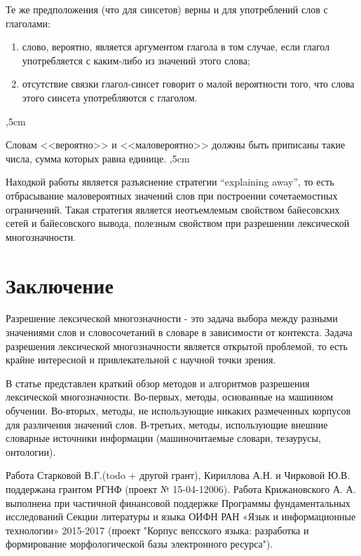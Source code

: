 \documentclass{article}
\begin{document}
\begin{articletext}
Те же предположения (что для синсетов) верны и для употреблений слов с глаголами:
\begin{enumerate}
\item слово, вероятно, является аргументом глагола в том случае, если глагол употребляется с каким-либо из значений этого слова;
\item отсутствие связки глагол-синсет говорит о малой вероятности того, что слова этого синсета употребляются с глаголом.
\end{enumerate}
,5cm

Словам <<вероятно>> и <<маловероятно>> должны быть приписаны такие числа, сумма которых равна единице. 
,5cm

Находкой работы \cite{Ciaramita 2000} является разъяснение стратегии “explaining away”, то есть отбрасывание маловероятных значений слов при построении сочетаемостных ограничений. Такая стратегия является неотъемлемым свойством байесовских сетей и байесовского вывода, полезным свойством при разрешении лексической многозначности. 

\section{Заключение}

Разрешение лексической многозначности - это задача выбора между разными значениями слов и словосочетаний в словаре в зависимости от контекста. Задача разрешения лексической многозначности является открытой проблемой, то есть крайне интересной и привлекательной с научной точки зрения.

В статье представлен краткий обзор методов и алгоритмов разрешения лексической многозначности. Во-первых, методы, основанные на машинном обучении.  Во-вторых, методы, не использующие никаких размеченных корпусов для различения значений слов. В-третьих, методы, использующие внешние словарные источники информации (машиночитаемые словари, тезаурусы, онтологии).

Работа Старковой В.Г.(todo + другой грант), Кириллова А.Н. и Чирковой Ю.В. поддержана грантом РГНФ (проект № 15-04-12006). Работа Крижановского А. А. выполнена при частичной финансовой поддержке Программы фундаментальных исследований Секции литературы и языка ОИФН РАН «Язык  и информационные технологии» 2015-2017 (проект "Корпус вепсского языка: разработка и формирование морфологической базы электронного ресурса").
 
\begin{thebibliography}{9}


\end{thebibliography}
\end{articletext}
\end{document}
